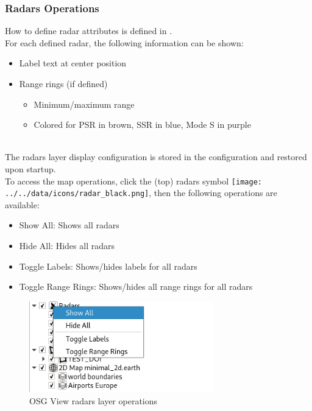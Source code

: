 \subsubsection{Radars Operations}
\label{sec:osg_radars_ops} 

How to define radar attributes is defined in . \\

For each defined radar, the following information can be shown:

\begin{itemize}
 \item Label text at center position
 \item Range rings (if defined)
\begin{itemize}
 \item Minimum/maximum range
 \item Colored for PSR in brown, SSR in blue, Mode S in purple
\end{itemize} 
\end{itemize} 
\ \\

The radars layer display configuration is stored in the configuration and restored upon startup. \\

To access the map operations, click the (top) radars symbol \texttt{[image: ../../data/icons/radar\_black.png]}, then the following operations are available:

\begin{itemize}
 \item Show All: Shows all radars
 \item Hide All: Hides all radars
 \item Toggle Labels: Shows/hides labels for all radars
 \item Toggle Range Rings: Shows/hides all range rings for all radars
\end{itemize} 

\begin{figure}[H]
    \includegraphics[width=8cm,frame]{figures/osgview_radars_ops.png}
  \caption{OSG View radars layer operations}
\end{figure}
